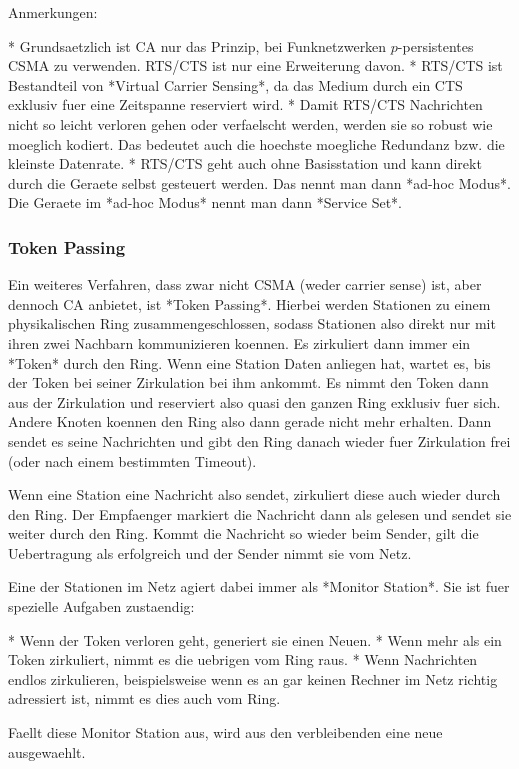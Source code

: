 Anmerkungen:

* Grundsaetzlich ist CA nur das Prinzip, bei Funknetzwerken $p$-persistentes
  CSMA zu verwenden. RTS/CTS ist nur eine Erweiterung davon.
* RTS/CTS ist Bestandteil von *Virtual Carrier Sensing*, da das Medium durch ein
  CTS exklusiv fuer eine Zeitspanne reserviert wird.
* Damit RTS/CTS Nachrichten nicht so leicht verloren gehen oder verfaelscht
  werden, werden sie so robust wie moeglich kodiert. Das bedeutet auch die
  hoechste moegliche Redundanz bzw. die kleinste Datenrate.
* RTS/CTS geht auch ohne Basisstation und kann direkt durch die Geraete selbst
  gesteuert werden. Das nennt man dann *ad-hoc Modus*. Die Geraete im *ad-hoc
  Modus* nennt man dann *Service Set*.

\subsubsection{Token Passing} 

Ein weiteres Verfahren, dass zwar nicht CSMA (weder carrier sense) ist, aber
dennoch CA anbietet, ist *Token Passing*. Hierbei werden Stationen zu einem
physikalischen Ring zusammengeschlossen, sodass Stationen also direkt nur mit
ihren zwei Nachbarn kommunizieren koennen. Es zirkuliert dann immer ein *Token*
durch den Ring. Wenn eine Station Daten anliegen hat, wartet es, bis der Token
bei seiner Zirkulation bei ihm ankommt. Es nimmt den Token dann aus der
Zirkulation und reserviert also quasi den ganzen Ring exklusiv fuer sich. Andere
Knoten koennen den Ring also dann gerade nicht mehr erhalten. Dann sendet es
seine Nachrichten und gibt den Ring danach wieder fuer Zirkulation frei (oder
nach einem bestimmten Timeout).

Wenn eine Station eine Nachricht also sendet, zirkuliert diese auch wieder durch
den Ring. Der Empfaenger markiert die Nachricht dann als gelesen und sendet sie
weiter durch den Ring. Kommt die Nachricht so wieder beim Sender, gilt die
Uebertragung als erfolgreich und der Sender nimmt sie vom Netz.

Eine der Stationen im Netz agiert dabei immer als *Monitor Station*. Sie ist
fuer spezielle Aufgaben zustaendig:

* Wenn der Token verloren geht, generiert sie einen Neuen.
* Wenn mehr als ein Token zirkuliert, nimmt es die uebrigen vom Ring raus.
* Wenn Nachrichten endlos zirkulieren, beispielsweise wenn es an gar keinen
  Rechner im Netz richtig adressiert ist, nimmt es dies auch vom Ring.

Faellt diese Monitor Station aus, wird aus den verbleibenden eine neue
ausgewaehlt.

